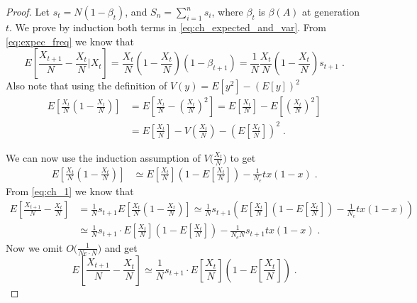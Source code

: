 \documentclass[12pt]{extarticle}
\begin{document}
\begin{proof}
Let $s_t=N(1-\beta_t)$, and $S_n=\sum\limits_{i=1}^n s_i$, where $\beta_t$ is $\beta(A)$ at generation $t$.
We prove by induction both terms in \cref{eq:ch_expected_and_var}.
From \cref{eq:expec_freq} we know that
\begin{equation}\label{eq:ch_1}
E\left[\frac{X_{t+1}}{N}-\frac{X_t}{N}\bigg|X_t\right] 
= \frac{X_t}{N}\left(1-\frac{X_t}{N}\right)(1-\beta_{t+1}) 
= \frac{1}{N}\frac{X_t}{N}\left(1-\frac{X_t}{N}\right)s_{t+1} \;.
\end{equation}
Also note that using the definition of $V(y)=E[y^2]-(E[y])^2$
\begin{equation}
\begin{split}
E\left[\frac{X_t}{N}\left(1-\frac{X_t}{N}\right)\right] 
&= E\left[\frac{X_t}{N}-\left(\frac{X_t}{N}\right)^2\right] 
= E\left[\frac{X_t}{N}\right] - E\left[\left(\frac{X_t}{N}\right)^2\right] \\
&= E\left[\frac{X_t}{N}\right] - V\left(\frac{X_t}{N}\right) - \left(E\left[\frac{X_t}{N}\right]\right)^2 \;.
\end{split}
\end{equation}

We can now use the induction assumption of $V\big(\frac{X_t}{N}\big)$ to get
\begin{equation}
\begin{split}
E\left[\frac{X_t}{N}\left(1-\frac{X_t}{N}\right)\right] 
&\simeq E\left[\frac{X_t}{N}\right]\left(1-E\left[\frac{X_t}{N}\right]\right)-\frac{1}{N_e}tx(1-x) \;.
\end{split}
\end{equation}
From \cref{eq:ch_1} we know that
\begin{equation}
\begin{split}
E\left[\frac{X_{t+1}}{N}-\frac{X_t}{N}\right] 
&= \frac{1}{N}s_{t+1}E\left[\frac{X_t}{N}\left(1-\frac{X_t}{N}\right)\right] 
\simeq \frac{1}{N}s_{t+1}\left(E\left[\frac{X_t}{N}\right]\left(1-E\left[\frac{X_t}{N}\right]\right) - \frac{1}{N_e}tx(1-x)\right) \\
&\simeq \frac{1}{N}s_{t+1}\cdot E\left[\frac{X_t}{N}\right]\left(1-E\left[\frac{X_t}{N}\right]\right) - \frac{1}{N_e N}s_{t+1}tx(1-x) \;.
\end{split}
\end{equation}
Now we omit $O\big(\frac{1}{Ne\cdot N}\big)$ and get
\begin{equation}\label{eq:ch_2}
E\left[\frac{X_{t+1}}{N}-\frac{X_t}{N}\right] \simeq \frac{1}{N}s_{t+1}\cdot E\left[\frac{X_t}{N}\right]\left(1-E\left[\frac{X_t}{N}\right]\right) \;.
\end{equation}


\end{proof}
\end{document}
